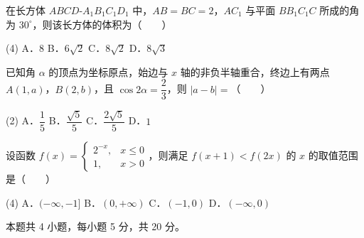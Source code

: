 \begin{question}
在长方体 $ABCD\text{-}A_1B_1C_1D_1$ 中，$AB=BC=2$，$AC_1$ 与平面 $BB_1C_1C$ 所成的角为 $30^\circ$，则该长方体的体积为\mbox{（　　）}

\begin{gkopts}(4)
\task A．$8$
\task B．$6\sqrt2$
\task C．$8\sqrt2$
\task D．$8\sqrt3$
\end{gkopts}

\end{question}
\begin{question}
已知角 $\alpha$ 的顶点为坐标原点，始边与 $x$ 轴的非负半轴重合，终边上有两点 $A(1,a)$，$B(2,b)$，且 $\cos2\alpha=\dfrac23$，则 $|a-b|=$\mbox{（　　）}

\begin{gkopts}(2)
\task A．$\dfrac15$
\task B．$\dfrac{\sqrt5}5$
\task C．$\dfrac{2\sqrt5}5$
\task D．$1$
\end{gkopts}

\end{question}
\begin{question}
设函数 $f(x)=\begin{cases}2^{-x},&x\le0\\ 1,&x>0\end{cases}$，则满足 $f(x+1)<f(2x)$ 的 $x$ 的取值范围是\mbox{（　　）}

\begin{gkopts}(4)
\task A．$(-\infty,-1]$
\task B．$(0,+\infty)$
\task C．$(-1,0)$
\task D．$(-\infty,0)$
\end{gkopts}

\par\medskip

\end{question}

\begin{gktip}
本题共 4 小题，每小题 5 分，共 20 分。
\end{gktip}

